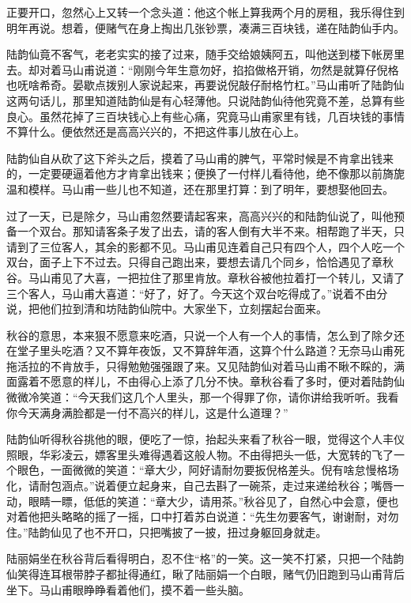 \documentclass[12pt,UTF8]{ctexbook}
\begin{document}
{{{正要开口，忽然心上又转一个念头道：他这个帐上算我两个月的房租，我乐得住到明年再说。想着，便赌气在身上掏出几张钞票，凑满三百块钱，递在陆韵仙手内。

陆韵仙竟不客气，老老实实的接了过来，随手交给娘姨阿五，叫他送到楼下帐房里去。却对着马山甫说道：“刚刚今年生意勿好，掐掐做格开销，勿然是就算仔倪格也呒啥希奇。晏歇点拨别人家说起来，再要说倪敲仔耐格竹杠。”马山甫听了陆韵仙这两句话儿，那里知道陆韵仙是有心轻薄他。只说陆韵仙待他究竟不差，总算有些良心。虽然花掉了三百块钱心上有些心痛，究竟马山甫家里有钱，几百块钱的事情不算什么。便依然还是高高兴兴的，不把这件事儿放在心上。

陆韵仙自从砍了这下斧头之后，摸着了马山甫的脾气，平常时候是不肯拿出钱来的，一定要硬逼着他方才肯拿出钱来；便换了一付样儿看待他，绝不像那以前旖旎温和模样。马山甫一些儿也不知道，还在那里打算：到了明年，要想娶他回去。

过了一天，已是除夕，马山甫忽然要请起客来，高高兴兴的和陆韵仙说了，叫他预备一个双台。那知请客条子发了出去，请的客人倒有大半不来。相帮跑了半天，只请到了三位客人，其余的影都不见。马山甫见连着自己只有四个人，四个人吃一个双台，面子上下不过去。只得自己跑出来，要想去请几个同乡，恰恰遇见了章秋谷。马山甫见了大喜，一把拉住了那里肯放。章秋谷被他拉着打一个转儿，又请了三个客人，马山甫大喜道：“好了，好了。今天这个双台吃得成了。”说着不由分说，把他们拉到清和坊陆韵仙院中。大家坐下，立刻摆起台面来。

秋谷的意思，本来狠不愿意来吃酒，只说一个人有一个人的事情，怎么到了除夕还在堂子里头吃酒？又不算年夜饭，又不算辞年酒，这算个什么路道？无奈马山甫死拖活拉的不肯放手，只得勉勉强强跟了来。又见陆韵仙对着马山甫不瞅不睬的，满面露着不愿意的样儿，不由得心上添了几分不快。章秋谷看了多时，便对着陆韵仙微微冷笑道：“今天我们这几个人里头，那一个得罪了你，请你讲给我听听。我看你今天满身满脸都是一付不高兴的样儿，这是什么道理？”

陆韵仙听得秋谷挑他的眼，便吃了一惊，抬起头来看了秋谷一眼，觉得这个人丰仪照眼，华彩凌云，嫖客里头难得遇着这般人物。不由得把头一低，大宽转的飞了一个眼色，一面微微的笑道：“章大少，阿好请耐勿要扳倪格差头。倪有啥怠慢格场化，请耐包涵点。”说着便立起身来，自己去斟了一碗茶，走过来递给秋谷；嘴唇一动，眼睛一瞟，低低的笑道：“章大少，请用茶。”秋谷见了，自然心中会意，便也对着他把头略略的摇了一摇，口中打着苏白说道：“先生勿要客气，谢谢耐，对勿住。”陆韵仙见了也不开口，只把嘴披了一披，扭过身躯回身就走。

陆丽娟坐在秋谷背后看得明白，忍不住“格”的一笑。这一笑不打紧，只把一个陆韵仙笑得连耳根带脖子都扯得通红，瞅了陆丽娟一个白眼，赌气仍旧跑到马山甫背后坐下。马山甫眼睁睁看着他们，摸不着一些头脑。

}}}
\end{document}

